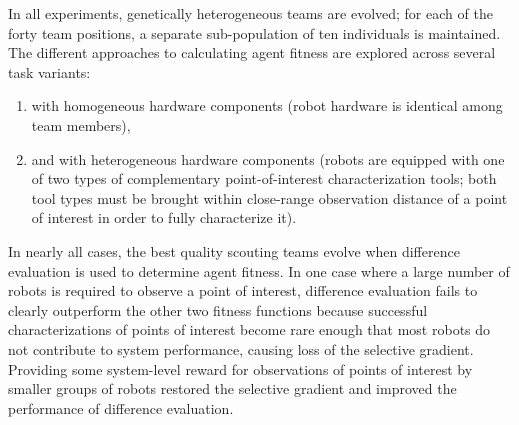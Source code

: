 In all experiments, genetically heterogeneous teams are evolved;
for each of the forty team positions, a separate sub-population of ten individuals is maintained.
The different approaches to calculating agent fitness are explored across several task variants:
\begin{enumerate}
  \item with homogeneous hardware components (robot hardware is identical among team members),
  \item and with heterogeneous hardware components (robots are equipped with one of two types of complementary point-of-interest characterization tools; both tool types must be brought within close-range observation distance of a point of interest in order to fully characterize it).
\end{enumerate}
In nearly all cases, the best quality scouting teams evolve when difference evaluation is used to determine agent fitness.
In one case where a large number of robots is required to observe a point of interest, difference evaluation fails to clearly outperform the other two fitness functions because successful characterizations of points of interest become rare enough that most robots do not contribute to system performance, causing loss of the selective gradient.
Providing some system-level reward for observations of points of interest by smaller groups of robots restored the selective gradient and improved the performance of difference evaluation.
